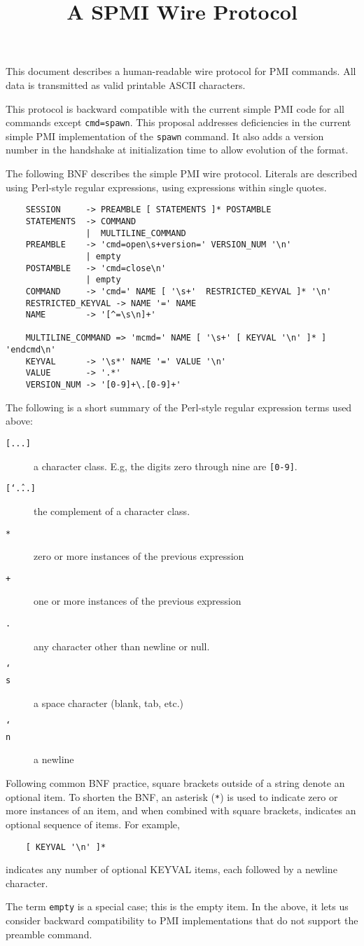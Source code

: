 \documentclass{article}
\title{A SPMI Wire Protocol}
\begin{document}
%
%
%
This document describes a human-readable wire protocol for PMI
commands.  All data is transmitted as valid printable ASCII
characters.

This protocol is backward compatible with the current simple PMI code
for all commands except \texttt{cmd=spawn}.   This proposal addresses
deficiencies in the current simple PMI implementation of the
\texttt{spawn} command.  It also adds a version number in the
handshake at initialization time to allow evolution of the format.

The following BNF describes the simple PMI wire protocol.  Literals are 
described using Perl-style regular expressions, using expressions within single
quotes.
\begin{verbatim}
    SESSION     -> PREAMBLE [ STATEMENTS ]* POSTAMBLE
    STATEMENTS  -> COMMAND
                |  MULTILINE_COMMAND
    PREAMBLE    -> 'cmd=open\s+version=' VERSION_NUM '\n'
                | empty
    POSTAMBLE   -> 'cmd=close\n'
                | empty
    COMMAND     -> 'cmd=' NAME [ '\s+'  RESTRICTED_KEYVAL ]* '\n'
    RESTRICTED_KEYVAL -> NAME '=' NAME
    NAME        -> '[^=\s\n]+'
    
    MULTILINE_COMMAND => 'mcmd=' NAME [ '\s+' [ KEYVAL '\n' ]* ] 'endcmd\n'
    KEYVAL      -> '\s*' NAME '=' VALUE '\n'
    VALUE       -> '.*'
    VERSION_NUM -> '[0-9]+\.[0-9]+'
\end{verbatim}
The following is a short summary of the Perl-style regular expression
terms used above:
\begin{description}
\item[\texttt{[...]}]a character class.  E.g, the digits zero through
 nine are \texttt{[0-9]}.
\item[\texttt{[\char`\^...]}]the complement of a character class.
\item[\texttt{*}]zero or more instances of the previous expression
\item[\texttt{+}]one or more instances of the previous expression
\item[\texttt{.}]any character other than newline or null.
\item[\texttt{\char`\\s}]a space character (blank, tab, etc.)
\item[\texttt{\char`\\n}]a newline
\end{description}
Following common BNF practice, square brackets outside of a string
denote an optional item.  To shorten the BNF, an asterisk (\texttt{*})
is used to indicate zero or more instances of an item, and when
combined with square brackets, indicates an optional sequence of
items.  For example, 
\begin{verbatim}
    [ KEYVAL '\n' ]*
\end{verbatim}
indicates any number of optional KEYVAL items, each followed by a
newline character.

The term \texttt{empty} is a special case; this is the empty item.  In
the above, it lets us consider backward compatibility to PMI
implementations that do not support the preamble command.
\end{document}
